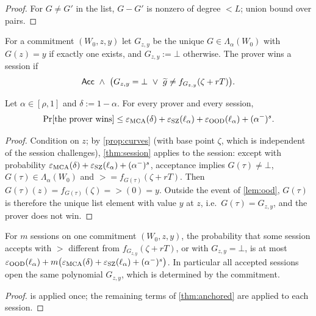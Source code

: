 \begin{proof}
For $G\ne G'$ in the list, $G-G'$ is nonzero of degree $<L$; union bound over pairs.
\end{proof}

\begin{definition}\label{def:anchored-ref}
For a commitment $(W_0,z,y)$ let $G_{z,y}$ be the unique $G\in\Lambda_\alpha(W_0)$ with
$G(z)=y$ if exactly one exists, and $G_{z,y}:=\bot$ otherwise. The prover wins a session if
\[
\mathsf{Acc}\ \wedge\ \bigl(G_{z,y}=\bot\ \vee\ \widetilde g\ne f_{G_{z,y}}(\zeta+rT)\bigr).
\]
\end{definition}

\begin{theorem}\label{thm:anchored}
Let $\alpha\in[\rho,1]$ and $\delta:=1-\alpha$. For every prover and every session,
\[
\Pr[\text{the prover wins}]\le\varepsilon_{\mathrm{MCA}}(\delta)+\varepsilon_{\mathrm{SZ}}(\ell_\alpha)
+\varepsilon_{\mathrm{OOD}}(\ell_\alpha)+(\alpha^-)^s .
\]
\end{theorem}

\begin{proof}
Condition on $z$; by \cref{prop:curves} (with base point $\zeta$, which is independent of
the session challenges), \cref{thm:session} applies to the session: except with
probability $\varepsilon_{\mathrm{MCA}}(\delta)+\varepsilon_{\mathrm{SZ}}(\ell_\alpha)+(\alpha^-)^s$, acceptance
implies $G(\tau)\ne\bot$, $G(\tau)\in\Lambda_\alpha(W_0)$ and $\gt=f_{G(\tau)}(\zeta+rT)$.
Then $G(\tau)(z)=f_{G(\tau)}(\zeta)=\gt(0)=y$. Outside the event of \cref{lem:ood},
$G(\tau)$ is therefore the unique list element with value $y$ at $z$, i.e.\
$G(\tau)=G_{z,y}$, and the prover does not win.
\end{proof}

\begin{corollary}\label{cor:anchored-eq}
For $m$ sessions on one commitment $(W_0,z,y)$, the probability that some session accepts
with $\gt$ different from $f_{G_{z,y}}(\zeta+rT)$, or with $G_{z,y}=\bot$, is at most
$\varepsilon_{\mathrm{OOD}}(\ell_\alpha)+m\bigl(\varepsilon_{\mathrm{MCA}}(\delta)+\varepsilon_{\mathrm{SZ}}(\ell_\alpha)+(\alpha^-)^s\bigr)$.
In particular all accepted sessions open the same polynomial $G_{z,y}$, which is
determined by the commitment.
\end{corollary}

\begin{proof}
 is applied once; the remaining terms of \cref{thm:anchored} are applied to
each session.
\end{proof}

